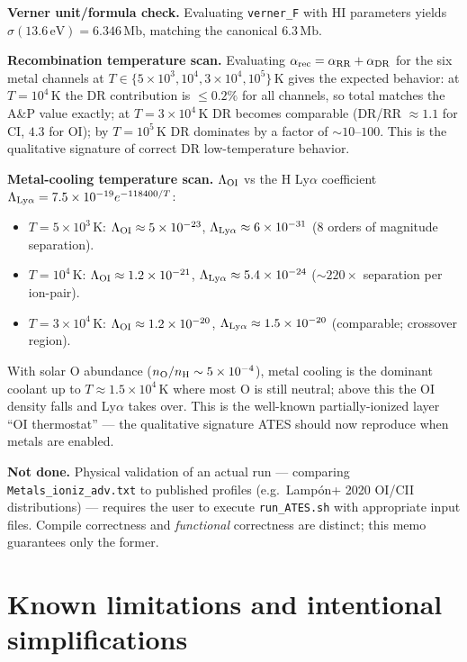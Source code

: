 \documentclass[english,a4paper]{kiseon_memo}
\begin{document}
\textbf{Verner unit/formula check.} Evaluating \texttt{verner\_F} with HI
parameters yields $\sigma(13.6\,\mathrm{eV}) = 6.346\,\mathrm{Mb}$, matching
the canonical $6.3\,\mathrm{Mb}$.

\textbf{Recombination temperature scan.} Evaluating
$\alpha_{\rm rec} = \alpha_{\rm RR} + \alpha_{\rm DR}$ for the six
metal channels at $T \in \{5\times 10^3, 10^4, 3\times 10^4, 10^5\}\,$K
gives the expected behavior: at $T = 10^4\,$K the DR contribution is
${\le}0.2\%$ for all channels, so total matches the A\&P value
exactly; at $T = 3\times 10^4\,$K DR becomes comparable
(DR/RR $\approx 1.1$ for CI, $4.3$ for OI); by $T = 10^5\,$K DR
dominates by a factor of $\sim 10$--$100$. This is the qualitative
signature of correct DR low-temperature behavior.

\textbf{Metal-cooling temperature scan.} $\Lambda_{\rm OI}$ vs the
H Ly$\alpha$ coefficient $\Lambda_{\rm Ly\alpha} = 7.5\times 10^{-19}
e^{-118400/T}$:
\begin{itemize}\itemsep 0pt
\item $T = 5\times 10^3\,$K: $\Lambda_{\rm OI} \approx 5\times 10^{-23}$,
$\Lambda_{\rm Ly\alpha} \approx 6\times 10^{-31}$ (8 orders of magnitude separation).
\item $T = 10^4\,$K: $\Lambda_{\rm OI} \approx 1.2 \times 10^{-21}$,
$\Lambda_{\rm Ly\alpha} \approx 5.4 \times 10^{-24}$
($\sim 220 \times$ separation per ion-pair).
\item $T = 3 \times 10^4\,$K: $\Lambda_{\rm OI} \approx 1.2 \times 10^{-20}$,
$\Lambda_{\rm Ly\alpha} \approx 1.5\times 10^{-20}$ (comparable;
crossover region).
\end{itemize}
With solar O abundance ($n_{\rm O}/n_{\rm H} \sim 5 \times 10^{-4}$),
metal cooling is the dominant coolant up to $T \approx 1.5 \times 10^4\,$K
where most O is still neutral; above this the OI density falls and
Ly$\alpha$ takes over. This is the well-known partially-ionized layer
``OI thermostat'' --- the qualitative signature ATES should now
reproduce when metals are enabled.

\textbf{Not done.} Physical validation of an actual run --- comparing
\texttt{Metals\_ioniz\_adv.txt} to published profiles (e.g.\ Lampón+ 2020
OI/CII distributions) --- requires the user to execute
\texttt{run\_ATES.sh} with appropriate input files. Compile correctness
and \emph{functional} correctness are distinct; this memo guarantees only
the former.

\section{Known limitations and intentional simplifications}
\end{document}
